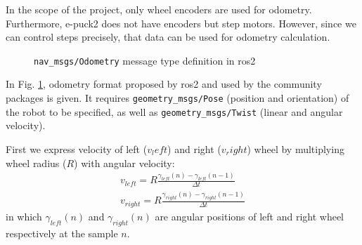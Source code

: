 In the scope of the project, only wheel encoders are used for odometry.
Furthermore, e-puck2 does not have encoders but step motors.
However, since we can control steps precisely, that data can be used for odometry calculation.

\begin{figure}[H]
    \centering
    \begin{subfigure}[b]{0.9\textwidth}
    \end{subfigure}
    \caption{\texttt{nav\_msgs/Odometry} message type definition in \ac{ros2}}
    \label{fig:simulation:odometry}
\end{figure}

In Fig. \ref{fig:simulation:odometry}, odometry format proposed by \ac{ros2} and used by the community packages is given. It requires \texttt{geometry\_msgs/Pose} (position and orientation) of the robot to be specified, as well as \texttt{geometry\_msgs/Twist} (linear and angular velocity).

First we express velocity of left ($v_left$) and right ($v_right$) wheel by multiplying wheel radius ($R$) with angular velocity:
\begin{equation}
\begin{aligned}
    v_{left} = R \frac{\gamma_{left}(n) - \gamma_{left}(n-1)}{\Delta t} \\
    v_{right} = R \frac{\gamma_{right}(n) - \gamma_{right}(n-1)}{\Delta t}
\end{aligned}
\end{equation}
in which $ \gamma_{left}(n) $ and $ \gamma_{right}(n) $ are angular positions of left and right wheel respectively at the sample $ n $.

